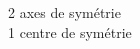\begin{exemple*1}
{\begin{multicols}{3}
\begin{center}
         2 axes de symétrie\\       
         1 centre de symétrie
      \end{center}
    \end{multicols}}
 \vspace*{-5mm}
 \end{exemple*1}